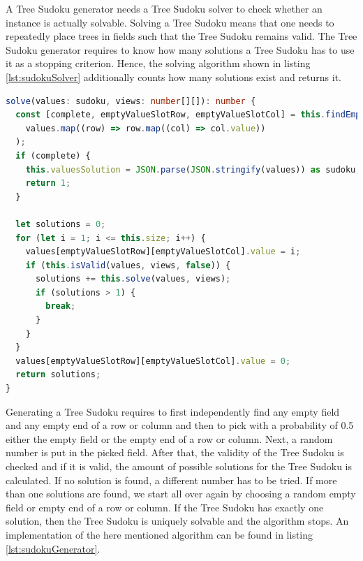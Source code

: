 A Tree Sudoku generator needs a Tree Sudoku solver to check whether an instance is actually solvable. Solving a Tree Sudoku means that one needs to repeatedly place trees in fields such that the Tree Sudoku remains valid. The Tree Sudoku generator requires to know how many solutions a Tree Sudoku has to use it as a stopping criterion. Hence, the solving algorithm shown in listing \ref{lst:sudokuSolver} additionally counts how many solutions exist and returns it.

\begin{lstlisting}[language=TypeScript,caption={Solving algorithm for a Tree Sudoku instance},label={lst:sudokuSolver}]
solve(values: sudoku, views: number[][]): number {
  const [complete, emptyValueSlotRow, emptyValueSlotCol] = this.findEmptySlot(
    values.map((row) => row.map((col) => col.value))
  );
  if (complete) {
    this.valuesSolution = JSON.parse(JSON.stringify(values)) as sudoku; // deep copy
    return 1;
  }

  let solutions = 0;
  for (let i = 1; i <= this.size; i++) {
    values[emptyValueSlotRow][emptyValueSlotCol].value = i;
    if (this.isValid(values, views, false)) {
      solutions += this.solve(values, views);
      if (solutions > 1) {
        break;
      }
    }
  }
  values[emptyValueSlotRow][emptyValueSlotCol].value = 0;
  return solutions;
}
\end{lstlisting}

Generating a Tree Sudoku requires to first independently find any empty field and any empty end of a row or column and then to pick with a probability of 0.5 either the empty field or the empty end of a row or column. Next, a random number is put in the picked field. After that, the validity of the Tree Sudoku is checked and if it is valid, the amount of possible solutions for the Tree Sudoku is calculated. If no solution is found, a different number has to be tried. If more than one solutions are found, we start all over again by choosing a random empty field or empty end of a row or column. If the Tree Sudoku has exactly one solution, then the Tree Sudoku is uniquely solvable and the algorithm stops. An implementation of the here mentioned algorithm can be found in listing \ref{lst:sudokuGenerator}.

